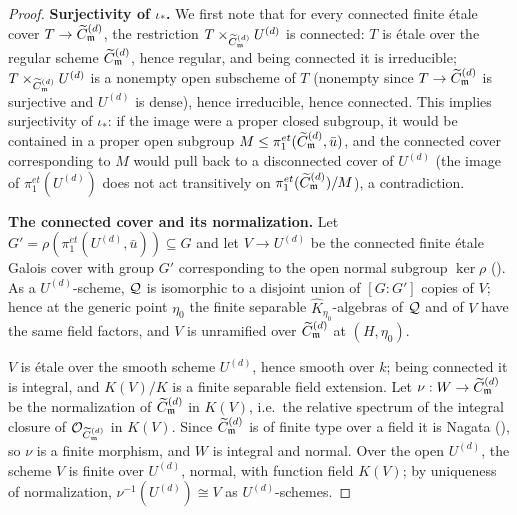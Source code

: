 \begin{proof}
    \textbf{Surjectivity of $\iota_*$.}
    We first note that for every connected finite \'etale cover $T \to \widetilde{C}_{\mathfrak{m}}^{(d)}$, the restriction
    $T \times_{\widetilde{C}_{\mathfrak{m}}^{(d)}} U^{(d)}$ is connected: $T$ is \'etale over the regular scheme $\widetilde{C}_{\mathfrak{m}}^{(d)}$, hence
    regular, and being connected it is irreducible; $T \times_{\widetilde{C}_{\mathfrak{m}}^{(d)}} U^{(d)}$ is a nonempty open
    subscheme of $T$ (nonempty since $T \to \widetilde{C}_{\mathfrak{m}}^{(d)}$ is surjective and $U^{(d)}$ is dense), hence
    irreducible, hence connected.
    This implies surjectivity of $\iota_*$: if the image were a proper closed subgroup, it would be
    contained in a proper open subgroup $M \leq \pi_1^{et}(\widetilde{C}_{\mathfrak{m}}^{(d)}, \bar{u})$, and the connected cover
    corresponding to $M$ would pull back to a disconnected cover of $U^{(d)}$ (the image of
    $\pi_1^{et}(U^{(d)})$ does not act transitively on $\pi_1^{et}(\widetilde{C}_{\mathfrak{m}}^{(d)})/M$), a contradiction.

    \textbf{The connected cover and its normalization.}
    Let $G' = \rho\left(\pi_1^{et}(U^{(d)}, \bar{u})\right) \subseteq G$ and let $V \to U^{(d)}$ be the connected
    finite \'etale Galois cover with group $G'$ corresponding to the open normal subgroup
    $\ker \rho$ (). As a $U^{(d)}$-scheme, $\mathcal{Q}$ is
    isomorphic to a disjoint union of $[G : G']$ copies of $V$; hence at the generic point $\eta_0$ the
    finite separable $\widehat{K}_{\eta_0}$-algebras of $\mathcal{Q}$ and of $V$ have the same field factors, and
    $V$ is unramified over $\widetilde{C}_{\mathfrak{m}}^{(d)}$ at $(H, \eta_0)$.

    $V$ is \'etale over the smooth scheme $U^{(d)}$, hence smooth over $k$; being connected it is
    integral, and $K(V)/K$ is a finite separable field extension. Let
    $\nu : W \to \widetilde{C}_{\mathfrak{m}}^{(d)}$ be the normalization of $\widetilde{C}_{\mathfrak{m}}^{(d)}$ in $K(V)$, i.e.\ the relative spectrum of
    the integral closure of $\mathcal{O}_{\widetilde{C}_{\mathfrak{m}}^{(d)}}$ in $K(V)$. Since $\widetilde{C}_{\mathfrak{m}}^{(d)}$ is of finite type over a field it
    is Nagata (), so $\nu$ is a finite morphism, and $W$ is integral and normal.
    Over the open $U^{(d)}$, the scheme $V$ is finite over $U^{(d)}$, normal, with function field $K(V)$;
    by uniqueness of normalization, $\nu^{-1}(U^{(d)}) \cong V$ as $U^{(d)}$-schemes.


\end{proof}
